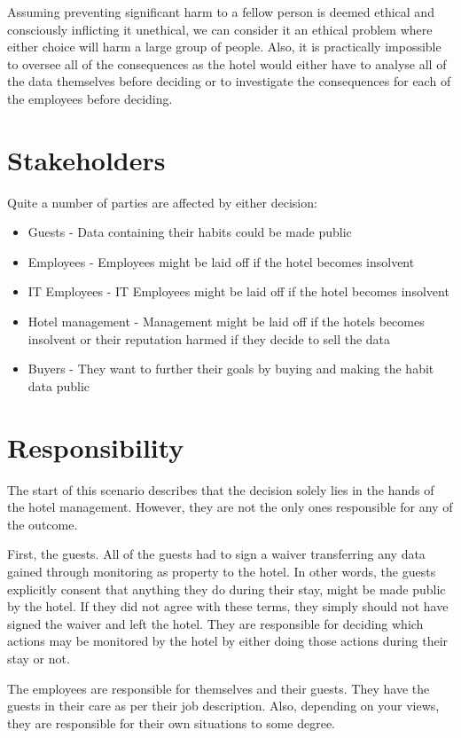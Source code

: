 Assuming preventing significant harm to a fellow person is deemed ethical and consciously inflicting it unethical, we can consider it an ethical problem where either choice will harm a large group of people. Also, it is practically impossible to oversee all of the consequences as the hotel would either have to analyse all of the data themselves before deciding or to investigate the consequences for each of the employees before deciding.

\section{Stakeholders}
Quite a number of parties are affected by either decision:

\begin{itemize}
	\item Guests - Data containing their habits could be made public
	\item Employees - Employees might be laid off if the hotel becomes insolvent
	\item IT Employees - IT Employees might be laid off if the hotel becomes insolvent
	\item Hotel management - Management might be laid off if the hotels becomes insolvent or their reputation harmed if they decide to sell the data
	\item Buyers - They want to further their goals by buying and making the habit data public
\end{itemize}


\section{Responsibility}
The start of this scenario describes that the decision solely lies in the hands of the hotel management. However, they are not the only ones responsible for any of the outcome.

First, the guests. All of the guests had to sign a waiver transferring any data gained through monitoring as property to the hotel. In other words, the guests explicitly consent that anything they do during their stay, might be made public by the hotel. If they did not agree with these terms, they simply should not have signed the waiver and left the hotel. They are responsible for deciding which actions may be monitored by the hotel by either doing those actions during their stay or not.

The employees are responsible for themselves and their guests. They have the guests in their care as per their job description. Also, depending on your views, they are responsible for their own situations to some degree.

